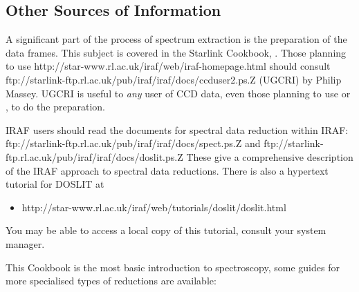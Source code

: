 \subsection{Other Sources of Information}

A significant part of the process of spectrum extraction
is the preparation of the  data frames.
This subject is covered in the Starlink Cookbook,
.
Those planning to use
{http://star-www.rl.ac.uk/iraf/web/iraf-homepage.html} should consult
{ftp://starlink-ftp.rl.ac.uk/pub/iraf/iraf/docs/ccduser2.ps.Z} (UGCRI) by
Philip Massey.
UGCRI is useful to {\em any} user of CCD data, even those
planning to use \cite{ccdpack} or
\cite{figaro}, to do the preparation.

IRAF users should read the documents for spectral data reduction
within IRAF:
{ftp://starlink-ftp.rl.ac.uk/pub/iraf/iraf/docs/spect.ps.Z}
and
{ftp://starlink-ftp.rl.ac.uk/pub/iraf/iraf/docs/doslit.ps.Z}
These give a comprehensive description of the IRAF approach to spectral
data reductions.  There is also a hypertext tutorial for DOSLIT at

\begin{itemize}

\item {}
      {http://star-www.rl.ac.uk/iraf/web/tutorials/doslit/doslit.html}

\end{itemize}

You may be able to access a local copy of this tutorial, consult your
system manager.

This Cookbook is the most basic introduction to spectroscopy, some
guides for more specialised types of reductions are available:

